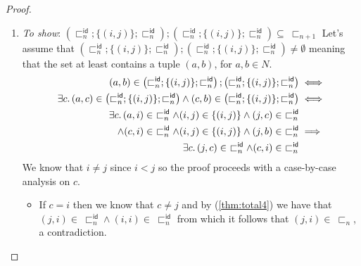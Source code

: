 \begin{lem}
{\begin{proof}
\begin{enumerate}[label=\alph*)]
			\begin{align*}
				\left( \sqsubset_n^\mathsf{id} ; \{ (i, j) \} ; \sqsubset_n^\mathsf{id} \right) ; \sqsubset_n &=\ \sqsubset_n^\mathsf{id} ; \left( \{ (i, j) \} ; \sqsubset_n^\mathsf{id} ; \sqsubset_n \right) \text{ by associativity} \\
				&=\ \sqsubset_n^\mathsf{id} ; \left( \{ (i, j) \} ; S' \right) \text{ by associativity} \\
				&\subseteq\ \sqsubset_n^\mathsf{id} ; \{ (i, j) \} ; \sqsubset_n^\mathsf{id} \\
				&\subseteq\ \sqsubset_{n + 1}
			\end{align*}
		\item \textit{To show}: $\left( \sqsubset_n^\mathsf{id} ; \{ (i, j) \} ; \sqsubset_n^\mathsf{id} \right) ; \left( \sqsubset_n^\mathsf{id} ; \{ (i, j) \} ; \sqsubset_n^\mathsf{id} \right) \subseteq\ \sqsubset_{n + 1}$
			\iffalse
			Let's assume that $\left( \sqsubset_n^\mathsf{id} ; \{ (i, j) \} ; \sqsubset_n^\mathsf{id} \right) ; \left( \sqsubset_n^\mathsf{id} ; \{ (i, j) \} ; \sqsubset_n^\mathsf{id} \right) \neq \emptyset$ meaning that the set at least contains a tuple $(a, b)$, for $a, b \in N$. 
			\begin{align}
				(a, b) \in \left( \sqsubset_n^\mathsf{id} ; \{ (i, j) \} ; \sqsubset_n^\mathsf{id} \right) ; \left( \sqsubset_n^\mathsf{id} ; \{ (i, j) \} ; \sqsubset_n^\mathsf{id} \right)
					&\iff \\
				\exists c \ldotp (a, c) \in \left( \sqsubset_n^\mathsf{id} ; \{ (i, j) \} ; \sqsubset_n^\mathsf{id} \right) \land (c, b) \in \left( \sqsubset_n^\mathsf{id} ; \{ (i, j) \} ; \sqsubset_n^\mathsf{id} \right)
					&\iff \\
				\exists c \ldotp (a, i) \in\ \sqsubset_n^\mathsf{id} \land (i, j) \in  \{(i, j)\} \land (j, c) \in\ \sqsubset_n^\mathsf{id} \\ \land (c, i) \in\ \sqsubset_n^\mathsf{id} \land (i, j) \in  \{(i, j)\} \land (j, b) \in\ \sqsubset_n^\mathsf{id}
					&\implies \\
				\label{thm:total4} \exists c \ldotp (j, c) \in\ \sqsubset_n^\mathsf{id} \land (c, i) \in\ \sqsubset_n^\mathsf{id}
			\end{align}
			We know that $i \neq j$ since $i < j$ so the proof proceeds with a case-by-case analysis on $c$.
			\begin{itemize}
				\item If $c = i$ then we know that $c \neq j$ and by (\ref{thm:total4}) we have that $(j, i) \in\ \sqsubset_n^\mathsf{id} \land (i, i) \in\ \sqsubset_n^\mathsf{id}$ from which it follows that $(j, i) \in\ \sqsubset_n$, a contradiction.

\end{itemize}
\end{enumerate}
\end{proof}}
\end{lem}
